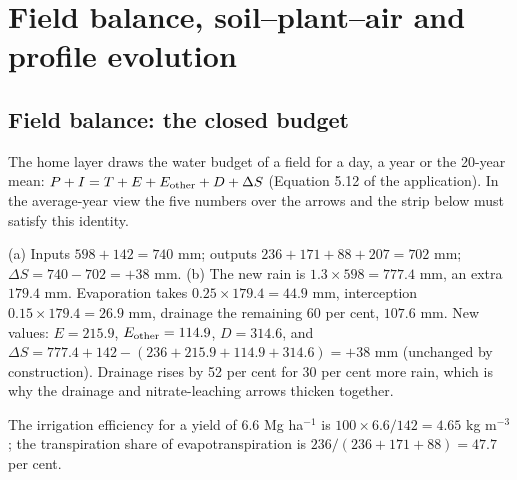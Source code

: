 \chapter{Field balance, soil--plant--air and profile evolution}\label{ch:bal}

\section{Field balance: the closed budget}
The home layer draws the water budget of a field for a day, a year or the 20-year mean: $P+I=T+E+E_{\rm other}+D+\Delta S$ (Equation 5.12 of the application). In the average-year view the five numbers over the arrows and the strip below must satisfy this identity.

\sol  (a) Inputs $598+142=740$ mm; outputs $236+171+88+207=702$ mm; $\Delta S=740-702=+38$ mm. (b) The new rain is $1.3\times598=777.4$ mm, an extra $179.4$ mm. Evaporation takes $0.25\times179.4=44.9$ mm, interception $0.15\times179.4=26.9$ mm, drainage the remaining $60$ per cent, $107.6$ mm. New values: $E=215.9$, $E_{\rm other}=114.9$, $D=314.6$, and $\Delta S=777.4+142-(236+215.9+114.9+314.6)=+38$ mm (unchanged by construction). Drainage rises by 52 per cent for 30 per cent more rain, which is why the drainage and nitrate-leaching arrows thicken together.

 The irrigation efficiency for a yield of 6.6 Mg ha$^{-1}$ is $100\times6.6/142=4.65$ kg m$^{-3}$; the transpiration share of evapotranspiration is $236/(236+171+88)=47.7$ per cent.


